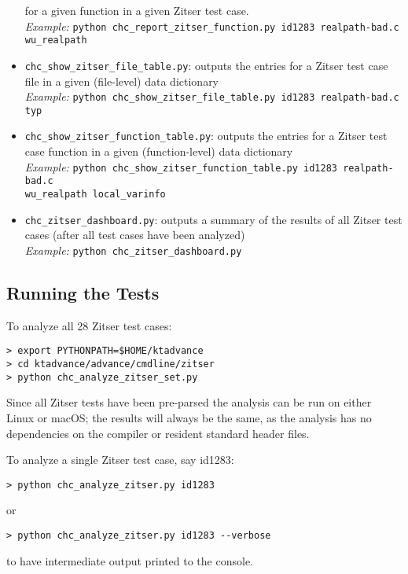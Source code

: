\documentclass[11pt]{article}
\begin{document}
\begin{itemize}[leftmargin=*]
  for a given function in a given Zitser test case.\\
\emph{Example:} {\tt python chc\_report\_zitser\_function.py id1283 realpath-bad.c wu\_realpath}
\item {\tt chc\_show\_zitser\_file\_table.py}: outputs the entries for a Zitser test case file
  in a given (file-level) data dictionary \\
\emph{Example:} {\tt python chc\_show\_zitser\_file\_table.py id1283 realpath-bad.c typ}
\item {\tt chc\_show\_zitser\_function\_table.py}: outputs the entries for a Zitser test case
  function in a given (function-level) data dictionary \\
\emph{Example:} {\tt python chc\_show\_zitser\_function\_table.py id1283 realpath-bad.c \\
    wu\_realpath local\_varinfo}
\item {\tt chc\_zitser\_dashboard.py}: outputs a summary of the results of all Zitser test
    cases (after all test cases have been analyzed) \\
\emph{Example:} {\tt python chc\_zitser\_dashboard.py} 
\end{itemize}

\subsection{Running the Tests}

To analyze all 28 Zitser test cases:
\begin{verbatim}
> export PYTHONPATH=$HOME/ktadvance
> cd ktadvance/advance/cmdline/zitser
> python chc_analyze_zitser_set.py
\end{verbatim}
Since all Zitser tests have been pre-parsed the analysis can be run on either Linux
or macOS; the results will always be the same, as the analysis has no dependencies
on the compiler or resident standard header files.

To analyze a single Zitser test case, say id1283:
\begin{verbatim}
> python chc_analyze_zitser.py id1283
\end{verbatim}
or 
\begin{verbatim}
> python chc_analyze_zitser.py id1283 --verbose
\end{verbatim}
to have intermediate output printed to the console.
\end{document}
